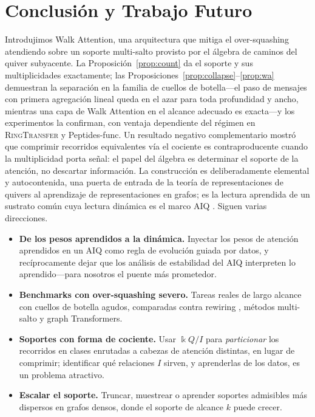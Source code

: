 \documentclass[runningheads]{llncs}
\newcommand{\kk}{\Bbbk}
\newcommand{\kQ}{\kk Q}
\begin{document}
\section{Conclusión y Trabajo Futuro}\label{sec:conclusion}

Introdujimos Walk Attention, una arquitectura que mitiga el over-squashing
atendiendo sobre un soporte multi-salto provisto por el álgebra de caminos del
quiver subyacente. La Proposición~\ref{prop:count} da el soporte y sus
multiplicidades exactamente; las
Proposiciones~\ref{prop:collapse}--\ref{prop:wa} demuestran la separación en la
familia de cuellos de botella---el paso de mensajes con primera agregación
lineal queda en el azar para toda profundidad y ancho, mientras una capa de
Walk Attention en el alcance adecuado es exacta---y los experimentos la
confirman, con ventaja dependiente del régimen en \textsc{RingTransfer} y
Peptides-func. Un resultado negativo complementario mostró que comprimir
recorridos equivalentes vía el cociente es contraproducente cuando la
multiplicidad porta señal: el papel del álgebra es determinar el soporte de la
atención, no descartar información. La construcción es deliberadamente
elemental y autocontenida, una puerta de entrada de la teoría de
representaciones de quivers al aprendizaje de representaciones en grafos; es la
lectura aprendida de un sustrato común cuya lectura dinámica es el marco AIQ
\cite{zainea2026aiq}. Siguen varias direcciones.

\begin{itemize}
  \item \textbf{De los pesos aprendidos a la dinámica.} Inyectar los pesos de
  atención aprendidos en un AIQ como regla de evolución guiada por datos, y
  recíprocamente dejar que los análisis de estabilidad del AIQ interpreten lo
  aprendido---para nosotros el puente más prometedor.
  \item \textbf{Benchmarks con over-squashing severo.} Tareas reales de largo
  alcance con cuellos de botella agudos, comparadas contra rewiring
  \cite{topping2022understanding}, métodos multi-salto \cite{gutteridge2023drew}
  y graph Transformers.
  \item \textbf{Soportes con forma de cociente.} Usar $\kQ/I$ para
  \emph{particionar} los recorridos en clases enrutadas a cabezas de atención
  distintas, en lugar de comprimir; identificar qué relaciones $I$ sirven, y
  aprenderlas de los datos, es un problema atractivo.
  \item \textbf{Escalar el soporte.} Truncar, muestrear o aprender soportes
  admisibles más dispersos en grafos densos, donde el soporte de alcance $k$
  puede crecer.
\end{itemize}
\end{document}
